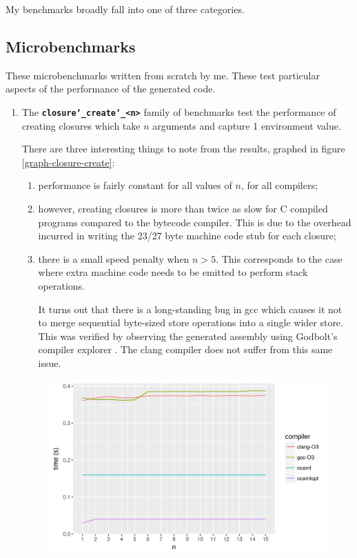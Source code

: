 \documentclass[12pt,a4paper,twoside,openright]{report}
\begin{document}
My benchmarks broadly fall into one of three categories.

\subsection{Microbenchmarks}
These microbenchmarks written from scratch by me. These test particular aspects
of the performance of the generated code.

\begin{enumerate}
  \item
    The \textbf{\texttt{closure\char`_create\char`_<n>}} family of benchmarks test the performance of
    creating closures which take $n$ arguments and capture 1 environment value.

    There are three interesting things to note from the results, graphed in figure \ref{graph-closure-create}:
    \begin{enumerate}
      \item performance is fairly constant for all values of $n$, for all compilers;
      \item however, creating closures is more than twice as slow for C
        compiled programs compared to the bytecode compiler. This is
        due to the overhead incurred in writing the 23/27 byte machine code stub
        for each closure;

      \item there is a small speed penalty when $n>5$. This
        corresponds to the case where extra machine code needs to be emitted to
        perform stack operations.

        It turns out that there is a long-standing
        bug in gcc which causes it not to merge sequential byte-sized store
        operations into a single wider store. This was verified by observing
        the generated assembly using Godbolt's compiler explorer
        \cite{godbolt}. The clang compiler does not suffer from this same
        issue.
    \end{enumerate}

    \begin{figure}[h]
\centering
  \includegraphics[width=16cm]{resultclosure_create_summary_all-b477d4580}


\end{figure}
\end{enumerate}
\end{document}
